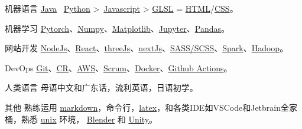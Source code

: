 
\begin{cvskills}

  \cvskill
    {机器语言}
    {\href{https://www.java.com/en/}{Java} \approx\, \href{https://www.python.org/}{Python} >\, \href{https://www.javascript.com/}{Javascript} > \href{https://www.khronos.org/opengl/wiki/OpenGL_Shading_Language}{GLSL} = \href{https://developer.mozilla.org/en-US/docs/Glossary/HTML5}{HTML}/\href{https://developer.mozilla.org/en-US/docs/Web/CSS}{CSS}。}

  \cvskill
    {机器学习} %
    {\href{https://pytorch.org/}{Pytorch}、\href{https://numpy.org/}{Numpy}、\href{https://matplotlib.org/}{Matplotlib}、\href{https://jupyter.org/}{Jupyter}、\href{https://pandas.pydata.org/}{Pandas}。}  %

  \cvskill
    {网站开发} %
    {\href{https://nodejs.org/en/}{NodeJs}、\href{https://reactjs.org/}{React}、\href{https://threejs.org/}{threeJs}、\href{https://nextjs.org/}{nextJs}、\href{https://sass-lang.com/}{SASS/SCSS}、\href{https://spark.apache.org/}{Spark}、\href{https://hadoop.apache.org/}{Hadoop}。}
 
  \cvskill
    {DevOps} %
    {\href{https://git-scm.com/}{Git}、\href{https://en.wikipedia.org/wiki/Code_review}{CR}、\href{https://aws.amazon.com/}{AWS}、\href{https://www.scrum.org/resources/what-is-scrum}{Scrum}、\href{https://www.docker.com/}{Docker}、\href{https://github.com/features/actions}{Github Actions}。}
  
  \cvskill
    {人类语言}
    {母语中文和广东话，流利英语，日语初学。}

  \cvskill
    {其他} %
    {熟练运用 \href{https://en.wikipedia.org/wiki/Markdown}{markdown}，命令行，\href{https://www.latex-project.org/}{latex}，和各类IDE如VSCode和Jetbrain全家桶，熟悉 \href{https://en.wikipedia.org/wiki/Unix}{unix} 环境， \href{https://www.blender.org/}{Blender} 和 \href{https://unity.com/}{Unity}。}

\end{cvskills}
